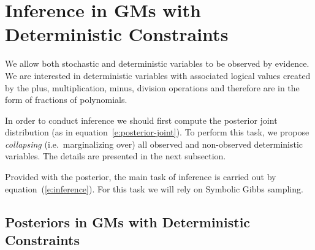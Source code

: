 \documentclass[letterpaper]{article}
\begin{document}
\section{Inference in GMs with Deterministic Constraints}
We allow both stochastic and deterministic variables to be observed by evidence.  
We are interested in deterministic variables with associated logical values  
created by the plus, multiplication, minus, division operations and therefore 
are in the form of fractions of polynomials.

In order to conduct inference we should first compute 
the posterior joint distribution  
(as in equation~\ref{e:posterior-joint}).
To perform this task, we propose \emph{collapsing} (i.e.\ marginalizing over) all observed and non-observed deterministic variables. The details are presented in the next subsection. 

Provided with the posterior, the main task of inference is carried out by equation~(\ref{e:inference}).
For this task we will rely on Symbolic Gibbs sampling.

\subsection{Posteriors in GMs with Deterministic Constraints}
\end{document}

